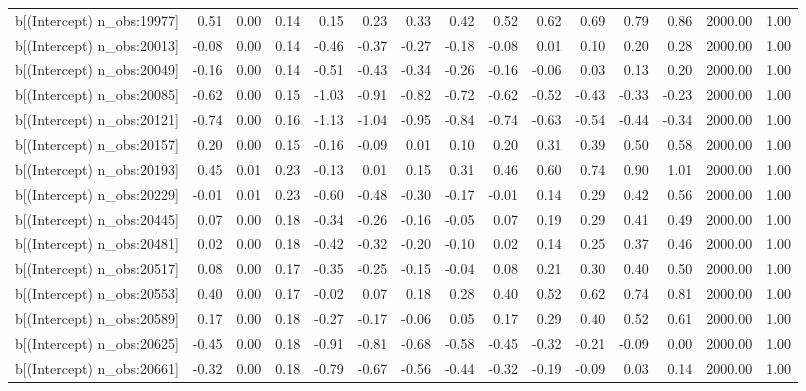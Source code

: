 \begin{table}[ht]
\begin{tabular}{rrrrrrrrrrrrrrr}
  b[(Intercept) n\_obs:19977] & 0.51 & 0.00 & 0.14 & 0.15 & 0.23 & 0.33 & 0.42 & 0.52 & 0.62 & 0.69 & 0.79 & 0.86 & 2000.00 & 1.00 \\ 
  b[(Intercept) n\_obs:20013] & -0.08 & 0.00 & 0.14 & -0.46 & -0.37 & -0.27 & -0.18 & -0.08 & 0.01 & 0.10 & 0.20 & 0.28 & 2000.00 & 1.00 \\ 
  b[(Intercept) n\_obs:20049] & -0.16 & 0.00 & 0.14 & -0.51 & -0.43 & -0.34 & -0.26 & -0.16 & -0.06 & 0.03 & 0.13 & 0.20 & 2000.00 & 1.00 \\ 
  b[(Intercept) n\_obs:20085] & -0.62 & 0.00 & 0.15 & -1.03 & -0.91 & -0.82 & -0.72 & -0.62 & -0.52 & -0.43 & -0.33 & -0.23 & 2000.00 & 1.00 \\ 
  b[(Intercept) n\_obs:20121] & -0.74 & 0.00 & 0.16 & -1.13 & -1.04 & -0.95 & -0.84 & -0.74 & -0.63 & -0.54 & -0.44 & -0.34 & 2000.00 & 1.00 \\ 
  b[(Intercept) n\_obs:20157] & 0.20 & 0.00 & 0.15 & -0.16 & -0.09 & 0.01 & 0.10 & 0.20 & 0.31 & 0.39 & 0.50 & 0.58 & 2000.00 & 1.00 \\ 
  b[(Intercept) n\_obs:20193] & 0.45 & 0.01 & 0.23 & -0.13 & 0.01 & 0.15 & 0.31 & 0.46 & 0.60 & 0.74 & 0.90 & 1.01 & 2000.00 & 1.00 \\ 
  b[(Intercept) n\_obs:20229] & -0.01 & 0.01 & 0.23 & -0.60 & -0.48 & -0.30 & -0.17 & -0.01 & 0.14 & 0.29 & 0.42 & 0.56 & 2000.00 & 1.00 \\ 
  b[(Intercept) n\_obs:20445] & 0.07 & 0.00 & 0.18 & -0.34 & -0.26 & -0.16 & -0.05 & 0.07 & 0.19 & 0.29 & 0.41 & 0.49 & 2000.00 & 1.00 \\ 
  b[(Intercept) n\_obs:20481] & 0.02 & 0.00 & 0.18 & -0.42 & -0.32 & -0.20 & -0.10 & 0.02 & 0.14 & 0.25 & 0.37 & 0.46 & 2000.00 & 1.00 \\ 
  b[(Intercept) n\_obs:20517] & 0.08 & 0.00 & 0.17 & -0.35 & -0.25 & -0.15 & -0.04 & 0.08 & 0.21 & 0.30 & 0.40 & 0.50 & 2000.00 & 1.00 \\ 
  b[(Intercept) n\_obs:20553] & 0.40 & 0.00 & 0.17 & -0.02 & 0.07 & 0.18 & 0.28 & 0.40 & 0.52 & 0.62 & 0.74 & 0.81 & 2000.00 & 1.00 \\ 
  b[(Intercept) n\_obs:20589] & 0.17 & 0.00 & 0.18 & -0.27 & -0.17 & -0.06 & 0.05 & 0.17 & 0.29 & 0.40 & 0.52 & 0.61 & 2000.00 & 1.00 \\ 
  b[(Intercept) n\_obs:20625] & -0.45 & 0.00 & 0.18 & -0.91 & -0.81 & -0.68 & -0.58 & -0.45 & -0.32 & -0.21 & -0.09 & 0.00 & 2000.00 & 1.00 \\ 
  b[(Intercept) n\_obs:20661] & -0.32 & 0.00 & 0.18 & -0.79 & -0.67 & -0.56 & -0.44 & -0.32 & -0.19 & -0.09 & 0.03 & 0.14 & 2000.00 & 1.00 \\ 

\end{tabular}
\end{table}
